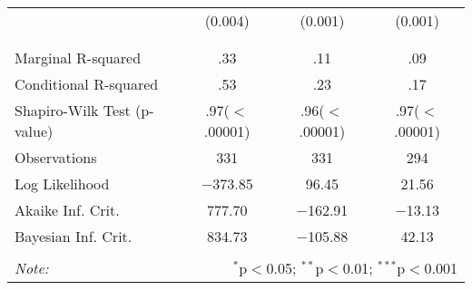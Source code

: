 \begin{table}[!htbp]
\begin{tabular}{@{\extracolsep{5pt}}lccc}
  & (0.004) & (0.001) & (0.001) \\ 
  & & & \\ 
\hline \\[-1.8ex] 
Marginal R-squared & .33 & .11 & .09 \\ 
Conditional R-squared & .53 & .23 & .17 \\ 
Shapiro-Wilk Test (p-value) & .97($<$.00001) & .96($<$.00001) & .97($<$.00001) \\ 
Observations & 331 & 331 & 294 \\ 
Log Likelihood & $-$373.85 & 96.45 & 21.56 \\ 
Akaike Inf. Crit. & 777.70 & $-$162.91 & $-$13.13 \\ 
Bayesian Inf. Crit. & 834.73 & $-$105.88 & 42.13 \\ 
\hline 
\hline \\[-1.8ex] 
\textit{Note:}  & \multicolumn{3}{r}{$^{*}$p$<$0.05; $^{**}$p$<$0.01; $^{***}$p$<$0.001} \\ 
\end{tabular} 
\end{table} 
